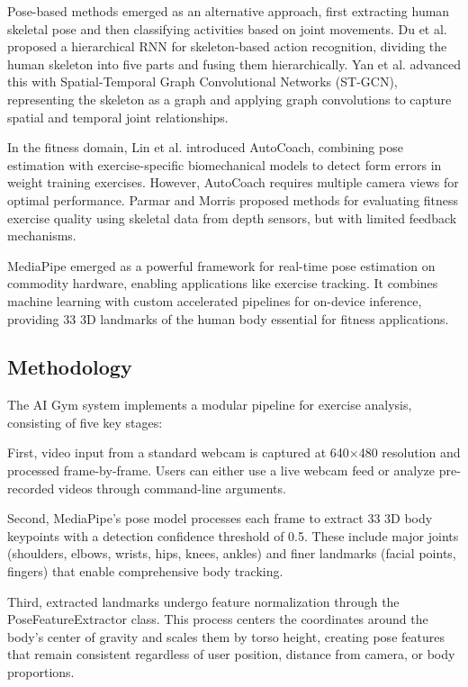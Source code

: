 \documentclass[11pt]{article}
\begin{document}
Pose-based methods emerged as an alternative approach, first extracting human skeletal pose and then classifying activities based on joint movements. Du et al. \cite{du2015} proposed a hierarchical RNN for skeleton-based action recognition, dividing the human skeleton into five parts and fusing them hierarchically. Yan et al. \cite{yan2018} advanced this with Spatial-Temporal Graph Convolutional Networks (ST-GCN), representing the skeleton as a graph and applying graph convolutions to capture spatial and temporal joint relationships.

In the fitness domain, Lin et al. \cite{lin2020} introduced AutoCoach, combining pose estimation with exercise-specific biomechanical models to detect form errors in weight training exercises. However, AutoCoach requires multiple camera views for optimal performance. Parmar and Morris \cite{parmar2019} proposed methods for evaluating fitness exercise quality using skeletal data from depth sensors, but with limited feedback mechanisms.

MediaPipe \cite{lugaresi2019} emerged as a powerful framework for real-time pose estimation on commodity hardware, enabling applications like exercise tracking. It combines machine learning with custom accelerated pipelines for on-device inference, providing 33 3D landmarks of the human body essential for fitness applications.

\subsection{Methodology}
The AI Gym system implements a modular pipeline for exercise analysis, consisting of five key stages:

First, video input from a standard webcam is captured at 640×480 resolution and processed frame-by-frame. Users can either use a live webcam feed or analyze pre-recorded videos through command-line arguments.

Second, MediaPipe's pose model processes each frame to extract 33 3D body keypoints with a detection confidence threshold of 0.5. These include major joints (shoulders, elbows, wrists, hips, knees, ankles) and finer landmarks (facial points, fingers) that enable comprehensive body tracking.

Third, extracted landmarks undergo feature normalization through the PoseFeatureExtractor class. This process centers the coordinates around the body's center of gravity and scales them by torso height, creating pose features that remain consistent regardless of user position, distance from camera, or body proportions.
\end{document}
